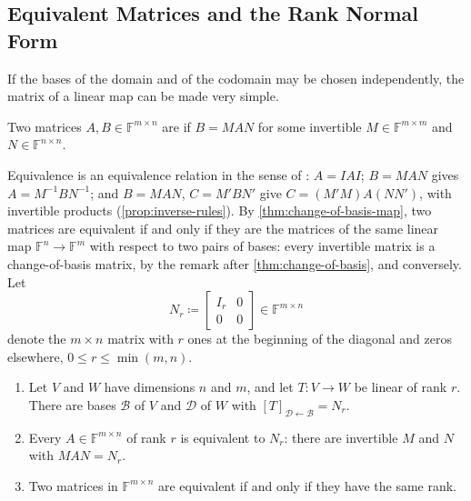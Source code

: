\subsection{Equivalent Matrices and the Rank Normal Form}

If the bases of the domain and of the codomain may be chosen independently, the matrix of a linear map can be made very simple.

\begin{definition}
\label{def:equivalent-matrices}
Two matrices $A,B\in\mathbb F^{m\times n}$ are  if $B=MAN$ for some invertible $M\in\mathbb F^{m\times m}$ and $N\in\mathbb F^{n\times n}$.
\end{definition}

Equivalence is an equivalence relation in the sense of : $A=IAI$; $B=MAN$ gives $A=M^{-1}BN^{-1}$; and $B=MAN$, $C=M'BN'$ give $C=(M'M)A(NN')$, with invertible products (\cref{prop:inverse-rules}). By \cref{thm:change-of-basis-map}, two matrices are equivalent if and only if they are the matrices of the same linear map $\mathbb F^n\to\mathbb F^m$ with respect to two pairs of bases: every invertible matrix is a change-of-basis matrix, by the remark after \cref{thm:change-of-basis}, and conversely. Let
\[
N_r\coloneqq\begin{bmatrix}I_r&0\\0&0\end{bmatrix}\in\mathbb F^{m\times n}
\]
denote the $m\times n$ matrix with $r$ ones at the beginning of the diagonal and zeros elsewhere, $0\le r\le\min(m,n)$.

\begin{theorem}
\label{thm:rank-normal-form}
\leavevmode
\begin{enumerate}
\item Let $V$ and $W$ have dimensions $n$ and $m$, and let $T\colon V\to W$ be linear of rank $r$. There are bases $\mathcal B$ of $V$ and $\mathcal D$ of $W$ with $[T]_{\mathcal D\leftarrow\mathcal B}=N_r$.
\item Every $A\in\mathbb F^{m\times n}$ of rank $r$ is equivalent to $N_r$: there are invertible $M$ and $N$ with $MAN=N_r$.
\item Two matrices in $\mathbb F^{m\times n}$ are equivalent if and only if they have the same rank.
\end{enumerate}
\end{theorem}

